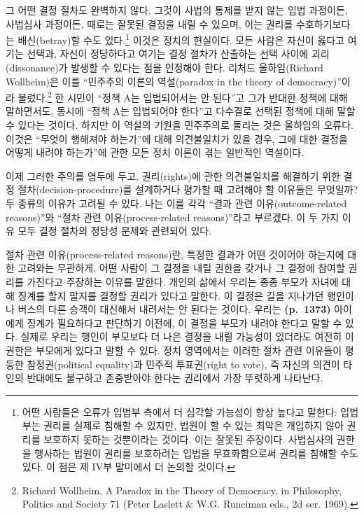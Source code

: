 \documentclass[a4paper,12pt,oneside]{article}  %
\begin{document}
그 어떤 결정 절차도 완벽하지 않다. 그것이 사법의 통제를 받지 않는 입법
과정이든, 사법심사 과정이든, 때로는 잘못된 결정을 내릴 수 있으며, 이는
권리를 수호하기보다는 배신(betray)할 수도 있다.\footnote{어떤 사람들은
  오류가 입법부 측에서 더 심각할 가능성이 항상 높다고 말한다: 입법부는
  권리를 실제로 침해할 수 있지만, 법원이 할 수 있는 최악은 개입하지 않아
  권리를 보호하지 못하는 것뿐이라는 것이다. 이는 잘못된 주장이다.
  사법심사의 권한을 행사하는 법원이 권리를 보호하려는 입법을
  무효화함으로써 권리를 침해할 수도 있다. 이 점은 제 IV부 말미에서 더
  논의할 것이다.} 이것은 정치의 현실이다. 모든 사람은 자신이 옳다고
여기는 선택과, 자신이 정당하다고 여기는 결정 절차가 산출하는 선택 사이에
괴리(dissonance)가 발생할 수 있다는 점을 인정해야 한다. 리처드
울하임(Richard Wollheim)은 이를 ``민주주의 이론의 역설(paradox in the
theory of democracy)''이라 불렀다.\footnote{Richard Wollheim, A Paradox
  in the Theory of Democracy, in Philosophy, Politics and Society 71
  (Peter Laslett \& W.G. Runciman eds., 2d ser. 1969).} 한 시민이 ``정책
A는 입법되어서는 안 된다''고 그가 반대한 정책에 대해 말하면서도, 동시에
``정책 A는 입법되어야 한다''고 다수결로 선택된 정책에 대해 말할 수
있다는 것이다. 하지만 이 역설의 기원을 민주주의로 돌리는 것은 울하임의
오류다. 이것은 ``무엇이 행해져야 하는가''에 대해 의견불일치가 있을 경우,
그에 대한 결정을 어떻게 내려야 하는가''에 관한 모든 정치 이론이 겪는
일반적인 역설이다.

이제 그러한 주의를 염두에 두고, 권리(rights)에 관한 의견불일치를
해결하기 위한 결정 절차(decision-procedure)를 설계하거나 평가할 때
고려해야 할 이유들은 무엇일까? 두 종류의 이유가 고려될 수 있다. 나는
이를 각각 ``결과 관련 이유(outcome-related reasons)''와 ``절차 관련
이유(process-related reasons)''라고 부르겠다. 이 두 가지 이유 모두 결정
절차의 정당성 문제와 관련되어 있다.

절차 관련 이유(process-related reasons)란, 특정한 결과가 어떤 것이어야
하는지에 대한 고려와는 무관하게, 어떤 사람이 그 결정을 내릴 권한을
갖거나 그 결정에 참여할 권리를 가진다고 주장하는 이유를 말한다. 개인의
삶에서 우리는 종종 부모가 자녀에 대해 징계를 할지 말지를 결정할 권리가
있다고 말한다. 이 결정은 길을 지나가던 행인이나 버스의 다른 승객이
대신해서 내려서는 안 된다는 것이다. 우리는 \textbf{(p.~1373)} 아이에게
징계가 필요하다고 판단하기 이전에, 이 결정을 부모가 내려야 한다고 말할
수 있다. 실제로 우리는 행인이 부모보다 더 나은 결정을 내릴 가능성이
있더라도 여전히 이 권한은 부모에게 있다고 말할 수 있다. 정치 영역에서는
이러한 절차 관련 이유들이 평등한 참정권(political equality)과 민주적
투표권(right to vote), 즉 자신의 의견이 타인의 반대에도 불구하고
존중받아야 한다는 권리에서 가장 뚜렷하게 나타난다.
\end{document}
